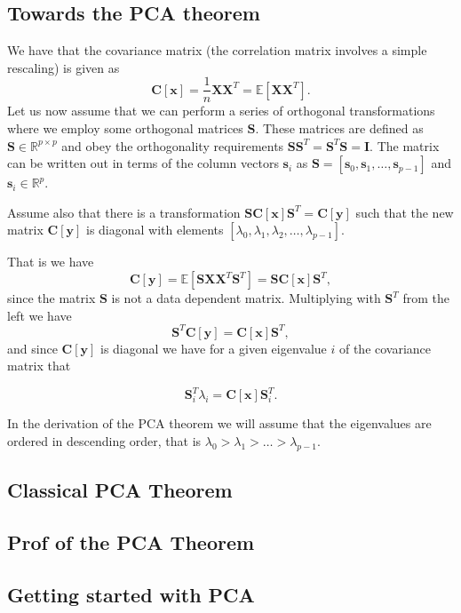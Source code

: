 \documentclass[%
oneside,                 %
final,                   %
10pt]{article}
\begin{document}
\subsection{Towards the PCA theorem}

We have that the covariance matrix (the correlation matrix involves a simple rescaling) is given as
\[
\bm{C}[\bm{x}] = \frac{1}{n}\bm{X}\bm{X}^T= \mathbb{E}[\bm{X}\bm{X}^T].
\]
Let us now assume that we can perform a series of orthogonal transformations where we employ some orthogonal matrices $\bm{S}$.
These matrices are defined as $\bm{S}\in {\mathbb{R}}^{p\times p}$ and obey the orthogonality requirements $\bm{S}\bm{S}^T=\bm{S}^T\bm{S}=\bm{I}$. The matrix can be written out in terms of the column vectors $\bm{s}_i$ as $\bm{S}=[\bm{s}_0,\bm{s}_1,\dots,\bm{s}_{p-1}]$ and $\bm{s}_i \in {\mathbb{R}}^{p}$.

Assume also that there is a transformation $\bm{S}\bm{C}[\bm{x}]\bm{S}^T=\bm{C}[\bm{y}]$ such that the new matrix $\bm{C}[\bm{y}]$ is diagonal with elements $[\lambda_0,\lambda_1,\lambda_2,\dots,\lambda_{p-1}]$.  

That is we have
\[
\bm{C}[\bm{y}] = \mathbb{E}[\bm{S}\bm{X}\bm{X}^T\bm{S}^T]=\bm{S}\bm{C}[\bm{x}]\bm{S}^T,
\]
since the matrix $\bm{S}$ is not a data dependent matrix.   Multiplying with $\bm{S}^T$ from the left we have
\[
\bm{S}^T\bm{C}[\bm{y}] = \bm{C}[\bm{x}]\bm{S}^T,
\]
and since $\bm{C}[\bm{y}]$ is diagonal we have for a given eigenvalue $i$ of the covariance matrix that

\[
\bm{S}^T_i\lambda_i = \bm{C}[\bm{x}]\bm{S}^T_i.
\]

In the derivation of the PCA theorem we will assume that the eigenvalues are ordered in descending order, that is
$\lambda_0 > \lambda_1 > \dots > \lambda_{p-1}$. 

\subsection{Classical PCA Theorem}



\subsection{Prof of the PCA Theorem}






\subsection{Getting started with PCA}
\end{document}
